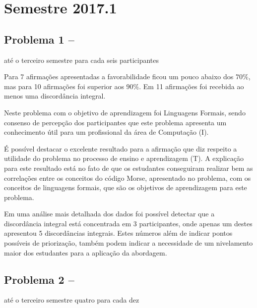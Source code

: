 \section{Semestre 2017.1}
\label{sec-sem-2017}


\subsection{Problema 1 -- \ProblemaG}
\label{sec-2017-p1}
{até o terceiro semestre}{ para cada seis participantes}

Para 7 afirmações apresentadas a favorabilidade ficou um pouco abaixo dos $70\%$, mas
para 10 afirmações foi superior aos $90\%$.
Em 11 afirmações foi recebida ao menos uma discordância integral.

Neste problema com o objetivo de aprendizagem foi Linguagens
Formais, sendo consenso de percepção dos participantes que
este problema apresenta um conhecimento útil para um profissional
da área de Computação (I).

É possível destacar o excelente resultado para a afirmação que diz respeito a
utilidade do problema no processo de ensino e aprendizagem (T).
A explicação para este resultado está no fato de que os estudantes
conseguiram realizar bem as correlações entre os conceitos
do código Morse, apresentado no problema, com os conceitos de
linguagens formais, que são os objetivos de aprendizagem para
este problema.

Em uma análise mais detalhada dos dados foi possível
detectar que a discordância integral está concentrada
em 3 participantes, onde apenas um destes apresentou
5 discordâncias integrais.
Estes números além de indicar pontos possíveis de
priorização, também podem indicar a necessidade
de um nivelamento maior dos estudantes para a aplicação
da abordagem.


\subsection{Problema 2 -- \ProblemaB}
{até o terceiro semestre}{ quatro para cada dez}

